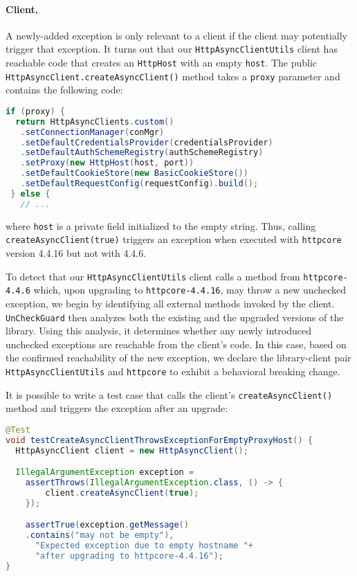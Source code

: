 \paragraph{Client.} A newly-added exception is only relevant to a client if the client may potentially
trigger that exception. It turns out that our \texttt{HttpAsyncClientUtils} client has reachable code
that creates an \texttt{HttpHost} with an empty \texttt{host}. The
public \texttt{HttpAsyncClient.createAsyncClient()} method
takes a \texttt{proxy} parameter and contains the following code:
\begin{lstlisting}[language=Java,basicstyle=\scriptsize\ttfamily]
 if (proxy) {
  return HttpAsyncClients.custom()
   .setConnectionManager(conMgr)
   .setDefaultCredentialsProvider(credentialsProvider)
   .setDefaultAuthSchemeRegistry(authSchemeRegistry)
   .setProxy(new HttpHost(host, port))
   .setDefaultCookieStore(new BasicCookieStore())
   .setDefaultRequestConfig(requestConfig).build();
 } else {
   // ...
\end{lstlisting}
where \texttt{host} is a private field initialized to the empty string.
Thus, calling \texttt{createAsyncClient(true)} triggers an exception when executed with
\texttt{httpcore} version 4.4.16 but not with 4.4.6.

To detect that our \texttt{HttpAsyncClientUtils} client calls a method from \texttt{httpcore-4.4.6} which, upon upgrading to \texttt{httpcore-4.4.16}, may throw a new unchecked exception, we begin by identifying all external methods invoked by the client. \texttt{UnCheckGuard} then analyzes both the existing and the upgraded versions of the library. Using this analysis, it determines whether any newly introduced unchecked exceptions are reachable from the client's code. In this case, based on the confirmed reachability of the new exception, we declare the library-client pair \texttt{HttpAsyncClientUtils} and \texttt{httpcore} to exhibit a behavioral breaking change.

It is possible to write a test case that calls the client's \texttt{createAsyncClient()} method
and triggers the exception after an upgrade:
\begin{lstlisting}[language=Java,basicstyle=\scriptsize\ttfamily]
@Test
void testCreateAsyncClientThrowsExceptionForEmptyProxyHost() {
  HttpAsyncClient client = new HttpAsyncClient();

  IllegalArgumentException exception =
    assertThrows(IllegalArgumentException.class, () -> {
        client.createAsyncClient(true);
    });

    assertTrue(exception.getMessage()
    .contains("may not be empty"),
      "Expected exception due to empty hostname "+
      "after upgrading to httpcore-4.4.16");
}
\end{lstlisting}




